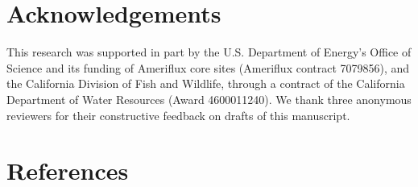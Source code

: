 \documentclass[
  12pt,
]{article}
\begin{document}
\section{Acknowledgements}\label{acknowledgements}

This research was supported in part by the U.S. Department of Energy's
Office of Science and its funding of Ameriflux core sites (Ameriflux
contract 7079856), and the California Division of Fish and Wildlife,
through a contract of the California Department of Water Resources
(Award 4600011240). We thank three anonymous reviewers for their
constructive feedback on drafts of this manuscript.

\section*{References}\label{references}
\end{document}
